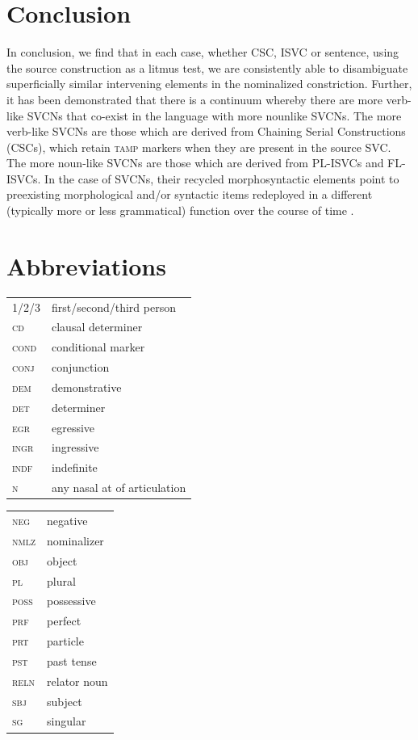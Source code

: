 \documentclass[output=paper,modfonts,nonflat,
colorlinks, citecolor=brown,
]{langsci/langscibook}
\begin{document}
\section{Conclusion}\label{sec:duah:5}
\largerpage
In conclusion, we find that in each case, whether CSC, ISVC or  sentence, using the source construction as a litmus test, we are consistently able to disambiguate superficially similar intervening elements in the nominalized constriction. Further, it has been demonstrated that there is a continuum whereby there are more verb-like SVCNs that co-exist in the language with more nounlike SVCNs. The more verb-like SVCNs are those which are derived from Chaining Serial Constructions (CSCs), which retain \textsc{tamp} markers when they are present in the source SVC. The more noun-like SVCNs are those which are derived from PL-ISVCs and FL-ISVCs. In the case of SVCNs, their recycled morphosyntactic elements point to preexisting morphological and/or syntactic items redeployed in a different (typically more or less grammatical) function over the course of time \citep{booij2007}.



\section*{Abbreviations}
\begin{tabularx}{.45\textwidth}{>{\scshape}lQ}
1/2/3 & first/second/{third person}\\
 cd & clausal determiner\\
 cond & {conditional} marker\\
 conj & conjunction\\
 dem & demonstrative\\
 det & determiner\\
 egr & egressive\\
 ingr & ingressive\\
 indf & indefinite\\
 n & any nasal at  of articulation\\
\end{tabularx}
\begin{tabularx}{.45\textwidth}{>{\scshape}lQ}
 neg & negative\\ 
 nmlz & nominalizer\\
 obj & object\\
 pl & plural\\
 poss & possessive\\
 prf & {perfect}\\
 prt & particle\\
 pst & {past tense}\\
 reln & relator noun\\
 sbj & {subject}\\
 sg & singular
\\
\end{tabularx}
\end{document}
